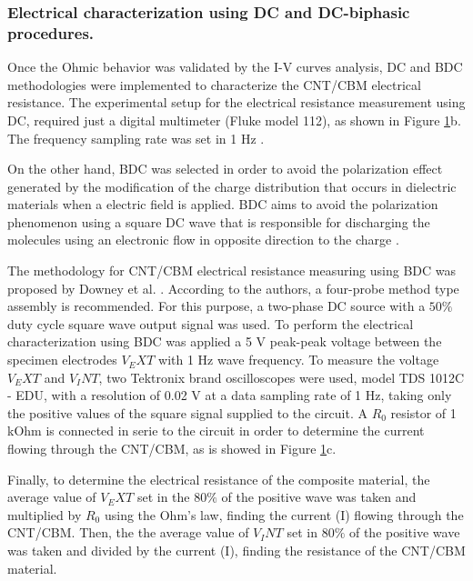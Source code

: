 \documentclass[twocolumn]{bmcart}%
\begin{document}
\subsubsection{Electrical characterization using DC and DC-biphasic procedures.}

Once the Ohmic behavior was validated by the I-V curves analysis, DC and BDC methodologies were implemented to characterize the  CNT/CBM electrical resistance. The experimental setup for the electrical resistance measurement using DC, required just a digital multimeter (Fluke model 112), as shown in Figure \ref{fig3}b. The frequency  sampling rate was set in 1 Hz \cite{Downey2017, Coppola2011, Dong2016}.

On the other hand, BDC was selected in order to avoid the polarization effect generated by the modification of the charge distribution that occurs in dielectric materials when a electric field is applied. BDC aims to avoid the polarization phenomenon using a square DC wave that is responsible for discharging the molecules using an electronic flow in opposite direction to the charge \cite{Downey2017a, BOTTCHER1973}.

The methodology for CNT/CBM electrical resistance measuring  using BDC was proposed by  Downey et al. \cite{Downey2017a}. According to the authors, a four-probe method type assembly is recommended. For this purpose, a two-phase DC source with a $50\%$ duty cycle square wave output signal was used.  To perform the electrical characterization using BDC was applied a 5 V peak-peak voltage between the specimen electrodes $V_EXT$ with 1 Hz wave frequency. To measure the voltage $V_EXT$ and $V_INT$, two Tektronix brand oscilloscopes were used, model TDS 1012C - EDU, with a resolution of 0.02 V at a data sampling rate of 1 Hz, taking only the positive values of the square signal supplied to the circuit. A $R_0$ resistor of 1 kOhm is connected in serie to the circuit in order to determine the current flowing through the CNT/CBM, as is showed in Figure \ref{fig3}c.

Finally, to determine the electrical resistance of the composite material, the average value of $V_EXT$ set in the $80\%$ of the positive wave was taken and multiplied by $R_0$ using the Ohm's law, finding the current (I) flowing through the CNT/CBM. Then, the the average value of $V_INT$ set in $80\%$ of the positive wave was taken and divided by the current (I), finding the resistance of the CNT/CBM material.

\begin{figure}[h!]
  \caption{
      }
  \label{fig3}
      \end{figure}
\end{document}
